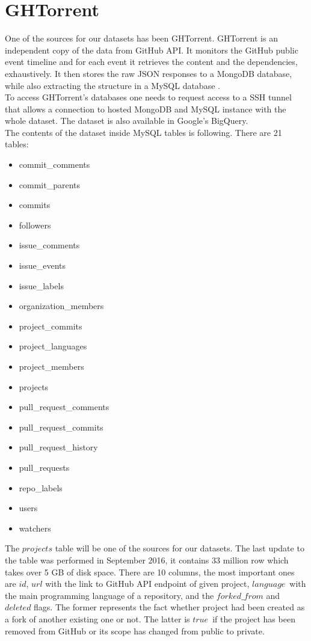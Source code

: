\documentclass[thesis=M,english]{FITthesis}[2012/10/20]
\begin{document}
\section{GHTorrent}

One of the sources for our datasets has been GHTorrent. GHTorrent is an independent copy of the data from GitHub API. It monitors the GitHub public event timeline and for each event it retrieves the content and the dependencies, exhaustively. It then stores the raw JSON responses to a MongoDB database, while also extracting the structure in a MySQL database \cite{ghtorrent}. \\

To access GHTorrent's databases one needs to request access to a SSH tunnel that allows a connection to hosted MongoDB and MySQL instance with the whole dataset. The dataset is also available in Google's BigQuery. \\

The contents of the dataset inside MySQL tables is following. There are 21 tables: 

\begin{multicols}{2}
\begin{itemize}
\item commit\_comments
\item commit\_parents
\item commits
\item followers
\item issue\_comments
\item issue\_events
\item issue\_labels
\item organization\_members
\item project\_commits
\item project\_languages
\item project\_members
\item projects
\item pull\_request\_comments
\item pull\_request\_commits
\item pull\_request\_history
\item pull\_requests
\item repo\_labels
\item users
\item watchers
\end{itemize}
\end{multicols}

The $projects$ table will be one of the sources for our datasets. The last update to the table was performed in September 2016, it contains 33 million row which takes over 5 GB of disk space. There are 10 columns, the most important ones are $id$, $url$ with the link to GitHub API endpoint of given project, $language$ with the main programming language of a repository, and the $forked\_from$ and $deleted$ flags. The former represents the fact whether project had been created as a fork of another existing one or not. The latter is $true$ if the project has been removed from GitHub or its scope has changed from public to private. \\
\end{document}
